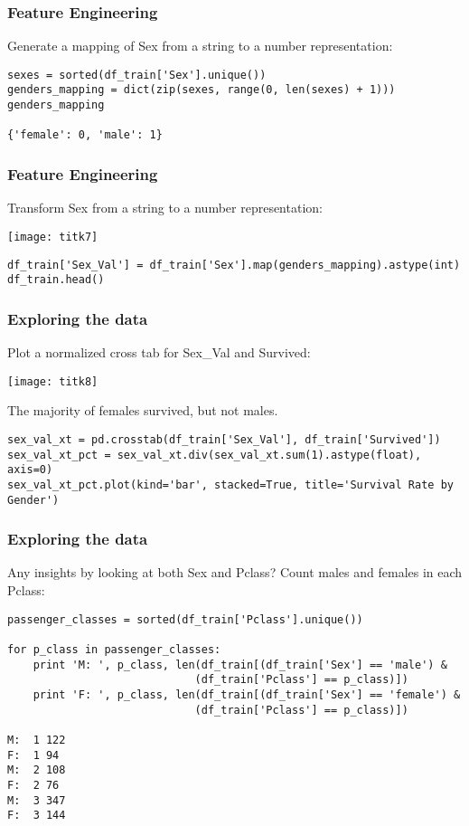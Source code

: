 \begin{frame}[fragile]\frametitle{Feature Engineering}
Generate a mapping of Sex from a string to a number representation:
\begin{lstlisting}
sexes = sorted(df_train['Sex'].unique())
genders_mapping = dict(zip(sexes, range(0, len(sexes) + 1)))
genders_mapping

{'female': 0, 'male': 1}
\end{lstlisting}
\end{frame}


\begin{frame}[fragile]\frametitle{Feature Engineering}
Transform Sex from a string to a number representation:

\begin{center}
\texttt{[image: titk7]}
\end{center}


\begin{lstlisting}
df_train['Sex_Val'] = df_train['Sex'].map(genders_mapping).astype(int)
df_train.head()
\end{lstlisting}

\end{frame}

\begin{frame}[fragile]\frametitle{Exploring  the data}
Plot a normalized cross tab for Sex\_Val and Survived:
\begin{center}
\texttt{[image: titk8]}
\end{center}

The majority of females survived, but not males.


\begin{lstlisting}
sex_val_xt = pd.crosstab(df_train['Sex_Val'], df_train['Survived'])
sex_val_xt_pct = sex_val_xt.div(sex_val_xt.sum(1).astype(float), axis=0)
sex_val_xt_pct.plot(kind='bar', stacked=True, title='Survival Rate by Gender')
\end{lstlisting}

\end{frame}

\begin{frame}[fragile]\frametitle{Exploring  the data}
Any insights by looking at both Sex and Pclass? Count males and females in each Pclass:
\begin{lstlisting}
passenger_classes = sorted(df_train['Pclass'].unique())

for p_class in passenger_classes:
    print 'M: ', p_class, len(df_train[(df_train['Sex'] == 'male') & 
                             (df_train['Pclass'] == p_class)])
    print 'F: ', p_class, len(df_train[(df_train['Sex'] == 'female') & 
                             (df_train['Pclass'] == p_class)])

M:  1 122
F:  1 94
M:  2 108
F:  2 76
M:  3 347
F:  3 144                             
\end{lstlisting}
\end{frame}

